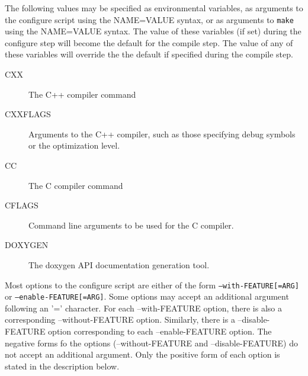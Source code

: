 \label{mes_vars_and_defs}
The following values may be specified as environmental variables, as arguments
to the configure script using the NAME=VALUE syntax, or as arguments to \texttt{make}
using the NAME=VALUE syntax.  The value of these variables (if set) during the
configure step will become the default for the compile step.  The value of any
of these variables will override the the default if specified during the compile
step.
\begin{description}
\item[CXX]       The C++ compiler command
\item[CXXFLAGS]  Arguments to the C++ compiler, such as those specifying 
debug symbols or the optimization level.
\item[CC]        The C compiler command
\item[CFLAGS]    Command line arguments to be used for the C compiler.
\item[DOXYGEN]   The doxygen API documentation generation tool.
\end{description}

Most options to the configure script are either of the form \texttt{--with-FEATURE[=ARG]} or
\texttt{--enable-FEATURE[=ARG]}.  Some options may accept an additional argument following 
an '=' character.  For each --with-FEATURE option, there is also a corresponding
--without-FEATURE option.  Similarly, there is a --disable-FEATURE option 
corresponding to each --enable-FEATURE option.  The negative forms fo the options 
(--without-FEATURE and --disable-FEATURE) do not accept an additional argument.  
Only the positive form of each option is stated in the description below.  

